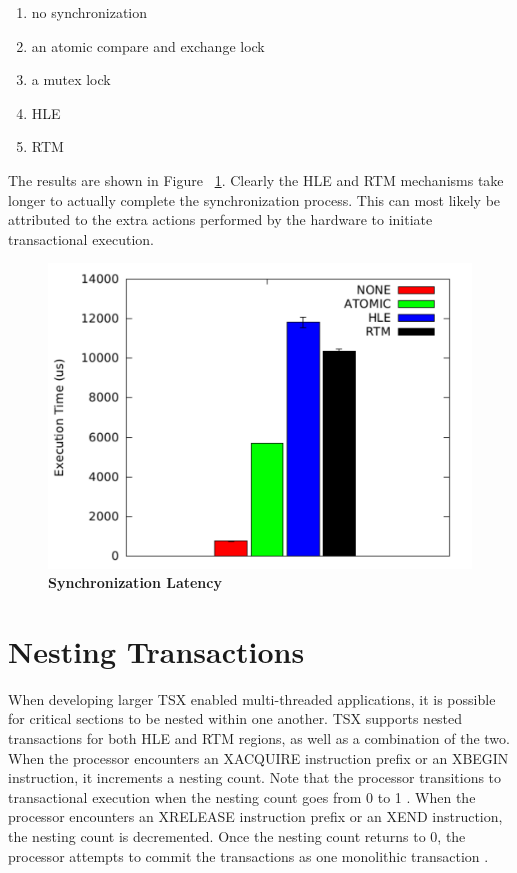 \documentclass[11pt]{book}
\begin{document}
\begin{enumerate}
  \item no synchronization 
  \item an atomic compare and exchange lock
  \item a mutex lock
  \item HLE
  \item RTM
\end{enumerate}

The results are shown in Figure ~\ref{fig:tsx_latency}.  Clearly the HLE and RTM
mechanisms take longer to actually complete the synchronization process.  This can most
likely be attributed to the extra actions performed by the hardware to initiate
transactional execution.

\begin{figure}[H]
    \centering
    \graphicspath{ {./figures/} }
    \includegraphics[width=\textwidth,height=\textheight,keepaspectratio]{SyncBM}
    \caption{\textbf{Synchronization Latency}}
    \label{fig:tsx_latency}
\end{figure}

\section{Nesting Transactions}

When developing larger TSX enabled multi-threaded applications, it is possible for
critical sections to be nested within one another.  TSX supports nested transactions for
both HLE and RTM regions, as well as a combination of the two.  When the processor
encounters an XACQUIRE instruction prefix or an XBEGIN instruction, it increments a
nesting count.  Note that the processor transitions to transactional execution when the
nesting count goes from 0 to 1 \cite{intel_prog_ref}.  When the processor encounters an
XRELEASE instruction prefix or an XEND instruction, the nesting count is decremented.
Once the nesting count returns to 0, the processor attempts to commit the transactions as
one monolithic transaction \cite{intel_prog_ref}.
\end{document}
